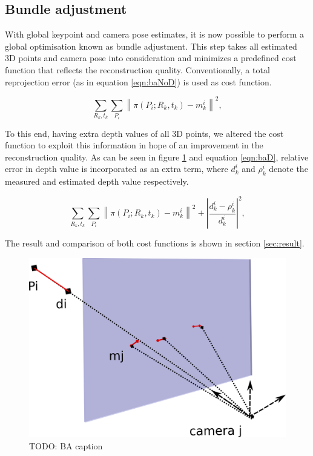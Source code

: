 \documentclass[10pt,twocolumn,letterpaper]{article}
\newcommand{\norm}[1]{\left\lVert #1 \right\rVert}
\begin{document}

\subsection{Bundle adjustment}

With global keypoint and camera pose estimates, it is now possible to perform a
global optimisation known as bundle adjustment. This step takes all estimated 3D
points and camera pose into consideration and minimizes a predefined cost
function that reflects the reconstruction quality.
Conventionally, a total reprojection error (as in equation \ref{eqn:baNoD})
is used as cost function.

\begin{equation}\label{eqn:baNoD}
\sum_{R_k,t_k}\sum_{P_i}{\norm{\pi\left(P_i;R_k,t_k\right)-m^i_{k}}}^2,
\end{equation}

To this end, having extra depth values of all 3D points, we altered the cost
function to exploit this information in hope of an improvement in the
reconstruction quality. As can be seen in figure \ref{fig:baCost} and equation
\ref{eqn:baD}, relative error in depth value is incorporated as an extra term,
where $d^i_k$ and $\rho^i_k$ denote the measured and estimated depth value
respectively.

\begin{equation}\label{eqn:baD}
\sum_{R_k,t_k}\sum_{P_i}{\norm{\pi\left(P_i;R_k,t_k\right)-m^i_{k}}^2+\left\lvert\dfrac{d^i_k-\rho^i_k}{d^i_k}\right\rvert ^2},
\end{equation}

The result and comparison of both cost functions is shown in section \ref{sec:result}.

\begin{figure}[t]
\begin{center}
   \includegraphics[width=0.9\linewidth]{figures/ba.pdf}
\end{center}
\caption{TODO: BA caption}
\label{fig:baCost}
\end{figure}
\end{document}
